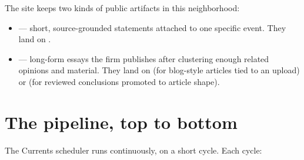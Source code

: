 \documentclass[11pt]{article}
\begin{document}
The site keeps two kinds of public artifacts in this neighborhood:

\begin{itemize}[leftmargin=*,itemsep=0.2em]
  \item {} --- short, source-grounded
        statements attached to one specific event. They land on
        .
  \item {} --- long-form essays the firm publishes after
        clustering enough related opinions and material. They land on
         (for blog-style articles tied to an
        upload) or  (for reviewed
        conclusions promoted to article shape).
\end{itemize}


\section{The pipeline, top to bottom}

The Currents scheduler runs continuously, on a short cycle. Each
cycle:
\end{document}

